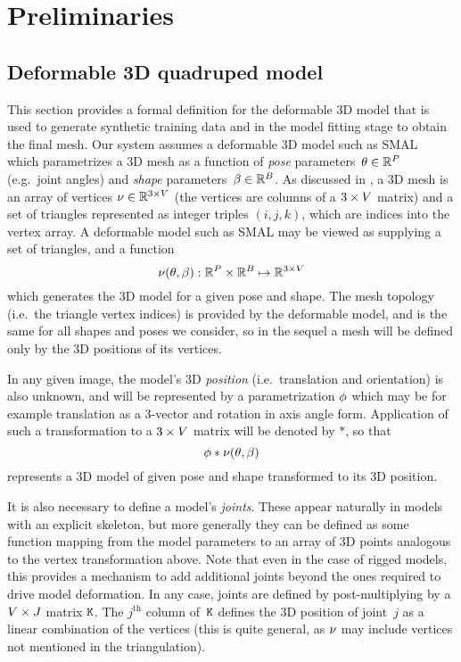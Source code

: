 \section{Preliminaries}

\subsection{Deformable 3D quadruped model}

This section provides a formal definition for the deformable 3D model that is used to generate synthetic training data and in the model fitting stage to obtain the final mesh. Our system assumes a deformable 3D model such as SMAL~\cite{zuffi2017menagerie} which parametrizes a 3D mesh as a function of {\em pose} parameters~$\theta \in {\mathbb{R}^{P}}$ (e.g.\ joint angles) and {\em shape} parameters~$\beta \in {\mathbb{R}^{B}}$. 
As discussed in , a 3D mesh is an array of vertices $\nu \in {\mathbb{R}^{3 \times V}}$ (the vertices are columns of a $3 \times V$ matrix) and a set of triangles represented as integer triples $(i,j,k)$, which are indices into the vertex array.
A deformable model such as SMAL may be viewed as supplying a set of triangles, and a function
\begin{equation}
\nu(\theta, \beta) : {\mathbb{R}^{P}} \times {\mathbb{R}^{B}} \mapsto {\mathbb{R}^{3 \times V}}
\end{equation}
which generates the 3D model for a given pose and shape.
The mesh topology (i.e.~the triangle vertex indices) is provided by the deformable model, and is the same for all shapes and poses we consider, so in the sequel a mesh will be defined only by the 3D positions of its vertices.

In any given image, the model's 3D {\em position} (i.e.\ translation and orientation) is also unknown, and will be represented by a parametrization $\phi$ which may be for example translation as a 3-vector and rotation in axis angle form. Application of such a transformation to a $3\times V$ matrix will be denoted by $*$, so that 
\begin{equation}
\phi * \nu(\theta, \beta)
\end{equation}
represents a 3D model of given pose and shape transformed to its 3D position.

It is also necessary to define a model's {\em joints}.  These appear naturally in models with an explicit skeleton, but more generally they can be defined as some function mapping from the model parameters to an array of 3D points analogous to the vertex transformation above. Note that even in the case of rigged models, this provides a mechanism to add additional joints beyond the ones required to drive model deformation. In any case, joints are defined by post-multiplying by a $V \times J$ matrix $\mathtt{K}$.  The $j^{\text{th}}$ column of~$\mathtt{K}$ defines the 3D position of joint~$j$ as a linear combination of the vertices (this is quite general, as $\nu$ may include vertices not mentioned in the triangulation).  

